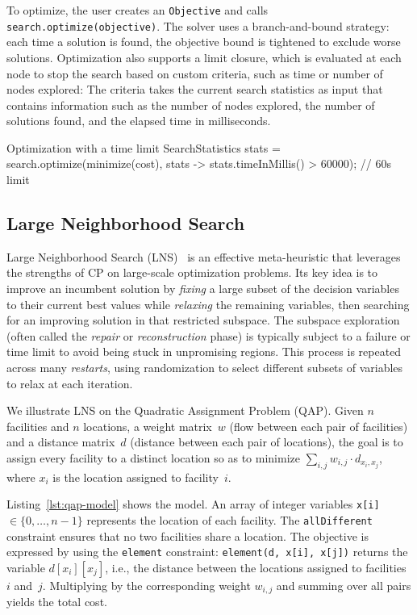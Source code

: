 \documentclass[11pt, a4paper]{scrartcl}
\begin{document}
To optimize, the user creates an \texttt{Objective} and calls \texttt{search.optimize(objective)}.
The solver uses a branch-and-bound strategy: each time a solution is found, the objective bound is tightened to exclude worse solutions.
Optimization also supports a limit closure, which is evaluated at each node to stop the search based on custom criteria, such as time or number of nodes explored:
The criteria takes the current search statistics as input that contains information such as the number of nodes explored, the number of solutions found, and the elapsed time in milliseconds.
\begin{codebox}{Optimization with a time limit}
SearchStatistics stats = search.optimize(minimize(cost),
    stats -> stats.timeInMillis() > 60000);  // 60s limit
\end{codebox}

\subsection{Large Neighborhood Search}
\label{sec:lns}

Large Neighborhood Search (LNS)~\cite{shaw1998using} is an effective
meta-heuristic that leverages the strengths of CP on large-scale
optimization problems.
Its key idea is to improve an incumbent solution by \emph{fixing} a
large subset of the decision variables to their current best values
while \emph{relaxing} the remaining variables, then searching for an
improving solution in that restricted subspace.
The subspace exploration (often called the \emph{repair} or
\emph{reconstruction} phase) is typically subject to a failure or time
limit to avoid being stuck in unpromising regions.
This process is repeated across many \emph{restarts}, using
randomization to select different subsets of variables to relax at each
iteration.

We illustrate LNS on the Quadratic Assignment Problem (QAP).
Given $n$ facilities and $n$ locations, a weight matrix~$w$ (flow
between each pair of facilities) and a distance matrix~$d$ (distance
between each pair of locations), the goal is to assign every facility
to a distinct location so as to minimize
$\sum_{i,j} w_{i,j} \cdot d_{x_i,x_j}$,
where $x_i$ is the location assigned to facility~$i$.

Listing~\ref{lst:qap-model} shows the model.
An array of integer variables \texttt{x[i]}$\in\{0,\ldots,n{-}1\}$ represents the location of each facility.
The \texttt{allDifferent} constraint ensures that no two facilities share a location.
The objective is expressed by using the \texttt{element} constraint:
\texttt{element(d, x[i], x[j])} returns the variable $d[x_i][x_j]$,
i.e., the distance between the locations assigned to facilities $i$
and~$j$.
Multiplying by the corresponding weight $w_{i,j}$ and summing over all
pairs yields the total cost.
\end{document}
